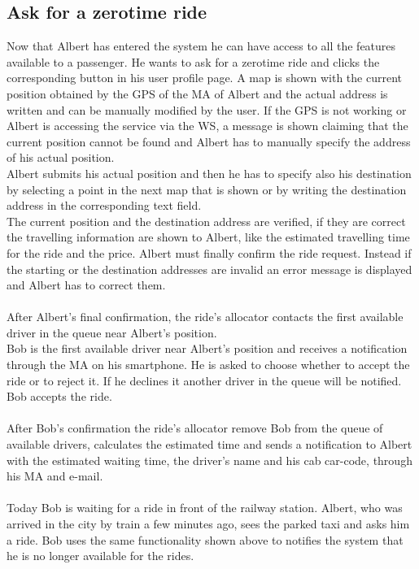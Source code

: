 \subsection{Ask for a zerotime ride}
Now that Albert has entered the system he can have access to all the features available to a passenger. He wants to ask for a zerotime ride and clicks the corresponding button in his user profile page. A map is shown with the current position obtained by the GPS of the MA of Albert and the actual address is written and can be manually modified by the user. If the GPS is not working or Albert is accessing the service via the WS, a message is shown claiming that the current position cannot be found and Albert has to manually specify the address of his actual position.\\
Albert submits his actual position and then he has to specify also his destination by selecting a point in the next map that is shown or by writing the destination address in the corresponding text field.\\
The current position and the destination address are verified, if they are correct the travelling information are shown to Albert, like the estimated travelling time for the ride and the price. Albert must finally confirm the ride request. Instead if the starting or the destination addresses are invalid an error message is displayed and Albert has to correct them.\\
\\
After Albert's final confirmation, the ride's allocator contacts the first available driver in the queue near Albert's position.\\
Bob is the first available driver near Albert's position and receives a notification through the MA on his smartphone. He is asked to choose whether to accept the ride or to reject it. If he declines it another driver in the queue will be notified.\\
Bob accepts the ride.\\
\\
After Bob's confirmation the ride's allocator remove Bob from the queue of available drivers, calculates the estimated time and sends a notification to Albert with the estimated waiting time, the driver's name and his cab car-code, through his MA and e-mail.\\
\\
Today Bob is waiting for a ride in front of the railway station. Albert, who was arrived in the city by train a few minutes ago, sees the parked taxi and asks him a ride. Bob uses the same functionality shown above to notifies the system that he is no longer available for the rides.

